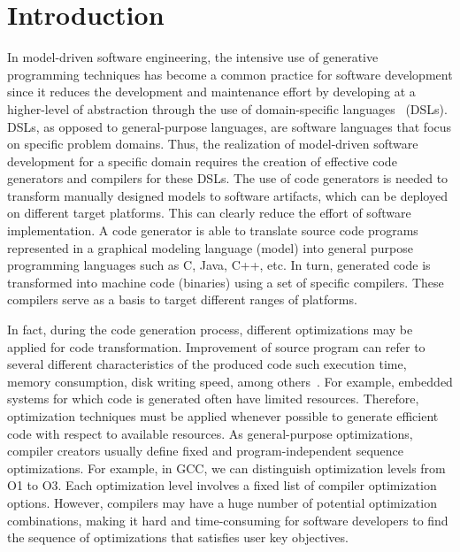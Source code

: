 \section{Introduction}
In model-driven software engineering, the intensive use of generative programming techniques has become a common practice for software development since it reduces the development and maintenance effort by developing at a higher-level of abstraction through the use of domain-specific languages~\cite{brambilla2012model} (DSLs). 
DSLs, as opposed to general-purpose languages, are software languages that focus on specific problem domains. Thus, the realization of model-driven software development for a specific domain requires the creation of effective code generators and compilers for these DSLs.
The use of code generators is needed to transform manually designed models to software artifacts, which can be deployed on different target platforms. This can clearly reduce the effort of software implementation. A code generator is able to translate source code programs represented in a graphical modeling language (model) into general purpose programming languages such as C, Java, C++, etc. In turn, generated code is transformed into machine code (binaries) using a set of specific compilers.
These compilers serve as a basis to target different ranges of platforms. 

In fact, during the code generation process, different optimizations may be applied for code transformation. Improvement of source program can refer to several different characteristics of the produced code such execution time, memory consumption, disk writing speed, among others~\cite{almagor2004finding,pan2006fast}.
For example, embedded systems for which code is generated often have limited resources. 
Therefore, optimization techniques must be applied whenever possible to generate efficient code with respect to available resources\cite{nagiub2013automatic}. 
As general-purpose optimizations, compiler creators usually define fixed and program-independent sequence optimizations.
For example, in GCC, we can distinguish optimization levels from O1 to O3. Each optimization level involves a fixed list of compiler optimization options. 
However, compilers may have a huge number of potential optimization combinations, making it hard and time-consuming for software developers to find the sequence of optimizations that satisfies user key objectives. 

